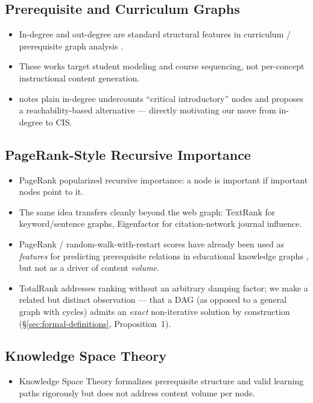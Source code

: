 \subsection{Prerequisite and Curriculum Graphs}
\begin{itemize}
    \item In-degree and out-degree are standard structural features in curriculum /
          prerequisite graph analysis \cite{capire2025, prereqnetworks2024}.
    \item These works target student modeling and course sequencing, not
          per-concept instructional content generation.
    \item \cite{prereqnetworks2024} notes plain in-degree undercounts ``critical
          introductory'' nodes and proposes a reachability-based alternative ---
          directly motivating our move from in-degree to CIS.
\end{itemize}

\subsection{PageRank-Style Recursive Importance}
\begin{itemize}
    \item PageRank \cite{brin1998} popularized recursive importance: a node is
          important if important nodes point to it.
    \item The same idea transfers cleanly beyond the web graph: TextRank
          \cite{mihalcea2004} for keyword/sentence graphs, Eigenfactor
          \cite{bergstrom2007} for citation-network journal influence.
    \item PageRank / random-walk-with-restart scores have already been used as
          \emph{features} for predicting prerequisite relations in educational
          knowledge graphs \cite{sle2019, cikm2016}, but not as a driver of content
          \emph{volume}.
    \item TotalRank \cite{boldi2005} addresses ranking without an arbitrary damping
          factor; we make a related but distinct observation --- that a DAG
          (as opposed to a general graph with cycles) admits an \emph{exact}
          non-iterative solution by construction (\S\ref{sec:formal-definitions},
          Proposition~1).
\end{itemize}

\subsection{Knowledge Space Theory}
\begin{itemize}
    \item Knowledge Space Theory \cite{doignon1985} formalizes prerequisite
          structure and valid learning paths rigorously but does not address
          content volume per node.
\end{itemize}

